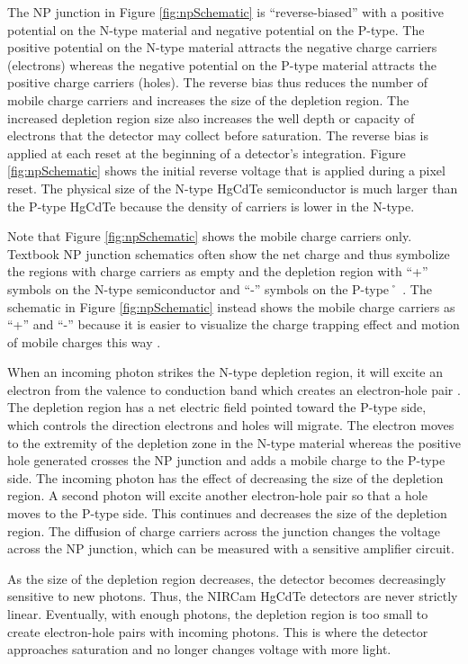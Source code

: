 \documentclass[]{aastex62}
\begin{document}
The NP junction in Figure \ref{fig:npSchematic} is ``reverse-biased'' with a positive potential on the N-type material and negative potential on the P-type.
The positive potential on the N-type material attracts the negative charge carriers (electrons) whereas the negative potential on the P-type material attracts the  positive charge carriers (holes).
The reverse bias thus reduces the number of mobile charge carriers and increases the size of the depletion region.
The increased depletion region size also increases the well depth or capacity of electrons that the detector may collect before saturation.
The reverse bias is applied at each reset at the beginning of a detector's integration.
Figure \ref{fig:npSchematic} shows the initial reverse voltage that is applied during a pixel reset. 
The physical size of the N-type HgCdTe semiconductor is much larger than the P-type HgCdTe because the density of carriers is lower in the N-type.

Note that Figure \ref{fig:npSchematic} shows the mobile charge carriers only.
Textbook NP junction schematics often show the net charge and thus symbolize the regions with charge carriers as empty and the depletion region with ``+'' symbols on the N-type semiconductor and ``-'' symbols on the P-type˚ \citep[e.g.][]{halliday2004physicsText}.
The schematic in Figure \ref{fig:npSchematic} instead shows the mobile charge carriers as ``+'' and ``-'' because it is easier to visualize the charge trapping effect and motion of mobile charges this way \citep[e.g.][]{smith2008imgPersistence}.

When an incoming photon strikes the N-type depletion region, it will excite an electron from the valence to conduction band which creates an electron-hole pair \citep{rieke2007irDetectorReview}.
The depletion region has a net electric field pointed toward the P-type side, which controls the direction electrons and holes will migrate.
The electron moves to the extremity of the depletion zone in the N-type material whereas the positive hole generated crosses the NP junction and adds a mobile charge to the P-type side.
The incoming photon has the effect of decreasing the size of the depletion region.
A second photon will excite another electron-hole pair so that a hole moves to the P-type side.
This continues and decreases the size of the depletion region.
The diffusion of charge carriers across the junction changes the voltage across the NP junction, which can be measured with a sensitive amplifier circuit.

As the size of the depletion region decreases, the detector becomes decreasingly sensitive to new photons.
Thus, the NIRCam HgCdTe detectors are never strictly linear.
Eventually, with enough photons, the depletion region is too small to create electron-hole pairs with incoming photons.
This is where the detector approaches saturation and no longer changes voltage with more light.
\end{document}
